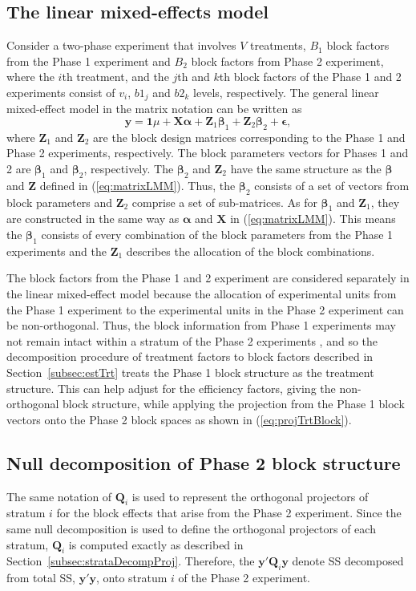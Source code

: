 \documentclass[article]{jss}
\newcommand{\Z}{\mathbf{Z}}
\newcommand{\X}{\mathbf{X}}
\newcommand{\Q}{\mathbf{Q}}
\begin{document}
\subsection{The linear mixed-effects model}
\label{subsec:phase2Model}
Consider a two-phase experiment that involves $V$ treatments, $B_1$ block factors from the Phase 1 experiment and $B_2$ block factors from Phase 2 experiment, where the $i$th treatment, and the $j$th and $k$th block factors of the Phase 1 and 2 experiments consist of $v_i$, $b1_j$ and $b2_k$ levels, respectively. The general linear mixed-effect model in the matrix notation can be written as
\begin{equation}
\label{eq:matrixTwoPhase}
\bm{y} = \bm{1}\mu + \X\bm{\alpha} + \Z_1\bm{\beta}_1 + \Z_2\bm{\beta}_2 + \bm{\epsilon},
\end{equation}
where $\Z_1$ and $\Z_2$ are the block design matrices corresponding to the Phase 1 and Phase 2 experiments, respectively. The block parameters vectors for Phases 1 and 2 are $\bm{\beta}_1$ and $\bm{\beta}_2$, respectively. The $\bm{\beta}_2$ and $\Z_2$ have the same structure as the $\bm{\beta}$ and $\Z$ defined in (\ref{eq:matrixLMM}). Thus, the  $\bm{\beta}_2$ consists of a set of vectors from block parameters and $\Z_2$ comprise a set of sub-matrices. As for $\bm{\beta}_1$ and $\Z_1$, they are constructed in the same way as $\bm{\alpha}$ and $\X$ in (\ref{eq:matrixLMM}). This means the $\bm{\beta}_1$ consists of every combination of the block parameters from the Phase 1 experiments and the $\Z_1$ describes the allocation of the block combinations. 

The block factors from the Phase 1 and 2 experiment are considered separately in the linear mixed-effect model because the allocation of experimental units from the Phase 1 experiment to the experimental units in the Phase 2 experiment can be non-orthogonal. Thus, the block information from Phase 1 experiments may not remain intact within a stratum of the Phase 2 experiments \cite{Wood1988}, and so the decomposition procedure of treatment factors to block factors described in Section~\ref{subsec:estTrt} treats the Phase 1 block structure as the treatment structure. This can help adjust for the efficiency factors, giving the non-orthogonal block structure, while applying the projection from the Phase 1 block vectors onto the Phase 2 block spaces as shown in (\ref{eq:projTrtBlock}). 

\subsection{Null decomposition of Phase 2 block structure}
The same notation of $\Q_i$ is used to represent the orthogonal projectors of stratum $i$ for the block effects that arise from the Phase 2 experiment. Since the same null decomposition is used to define the orthogonal projectors of each stratum, $\Q_i$ is computed exactly as described in Section~\ref{subsec:strataDecompProj}. Therefore, the $\bm{y}' \Q_i \bm{y}$ denote SS decomposed from total SS, $\bm{y}'\bm{y}$, onto stratum $i$ of the Phase 2 experiment.   
\end{document}
